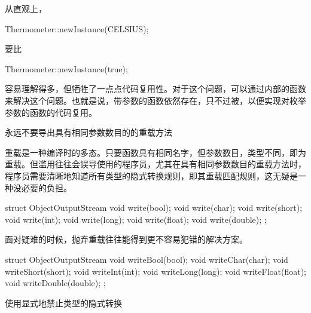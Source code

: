 \begin{content}
从直观上，

\begin{leftbar}
\begin{c++}
Thermometer::newInstance(CELSIUS);
\end{c++}
\end{leftbar}

要比

\begin{leftbar}
\begin{c++}
Thermometer::newInstance(true);
\end{c++}
\end{leftbar}

容易理解得多，但牺牲了一点点代码复用性。对于这个问题，可以通过内部的函数来解决这个问题。也就是说，带参数的函数依然存在，只不过被，以便实现对枚举参数的函数的代码复用。

\begin{regulation}
永远不要导出具有相同参数数目的的重载方法
\end{regulation}

重载是一种编译时的多态。只要函数具有相同名字，但参数数目，类型不同，即为重载。但滥用往往会误导使用的程序员，尤其在具有相同参数数目的重载方法时，程序员需要清晰地知道所有类型的隐式转换规则，即其重载匹配规则，这无疑是一种没必要的负担。

\begin{leftbar}
\begin{c++}
struct ObjectOutputStream
{
    void write(bool);
    void write(char);
    void write(short);
    void write(int);
    void write(long);
    void write(float);
    void write(double);
};
\end{c++}
\end{leftbar}

面对疑难的时候，抛弃重载往往能得到更不容易犯错的解决方案。

\begin{leftbar}
\begin{c++}
struct ObjectOutputStream
{
    void writeBool(bool);
    void writeChar(char);
    void writeShort(short);
    void writeInt(int);
    void writeLong(long);
    void writeFloat(float);
    void writeDouble(double);
};
\end{c++}
\end{leftbar}

\begin{regulation}
使用显式地禁止类型的隐式转换
\end{regulation}


\end{content}
